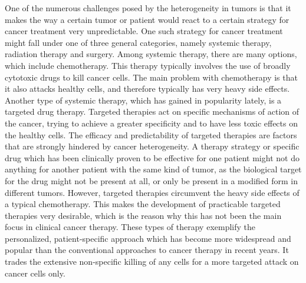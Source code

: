 One of the numerous challenges posed by the heterogeneity in tumors is that it makes the way a certain tumor or patient would react to a certain strategy for cancer treatment very unpredictable.
One such strategy for cancer treatment might fall under one of three general categories, namely systemic therapy, radiation therapy and surgery.
Among systemic therapy, there are many options, which include chemotherapy.
This therapy typically involves the use of broadly cytotoxic drugs to kill cancer cells.
The main problem with chemotherapy is that it also attacks healthy cells, and therefore typically has very heavy side effects.
Another type of systemic therapy, which has gained in popularity lately, is a targeted drug therapy.
Targeted therapies act on specific mechanisms of action of the cancer, trying to achieve a greater specificity and to have less toxic effects on the healthy cells.
The efficacy and predictability of targeted therapies are factors that are strongly hindered by cancer heterogeneity.
A therapy strategy or specific drug which has been clinically proven to be effective for one patient might not do anything for another patient with the same kind of tumor, as the biological target for the drug might not be present at all, or only be present in a modified form in different tumors.
However, targeted therapies circumvent the heavy side effects of a typical chemotherapy.
This makes the development of practicable targeted therapies very desirable, which is the reason why this has not been the main focus in clinical cancer therapy.
These types of therapy exemplify the personalized, patient-specific approach which has become more widespread and popular than the conventional approaches to cancer therapy in recent years. It trades the extensive non-specific killing of any cells for a more targeted attack on cancer cells only.

